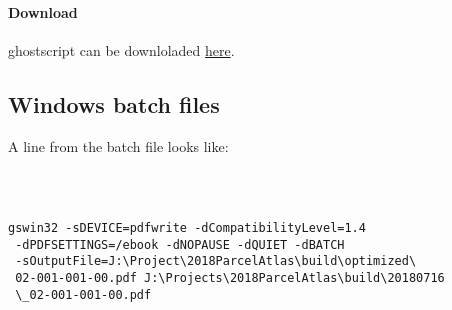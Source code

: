 \documentclass[class=article , crop=false, titlepage, twoside, multi={itemize, figure, verbatim}, float=false]{standalone}
\begin{document}
\paragraph{Download}
ghostscript can be downloladed \href{https://www.ghostscript.com/download/gsdnld.html}{here}.


\subsection{Windows batch files}
A line from the batch file looks like:\\
\begin{verbatim}



gswin32 -sDEVICE=pdfwrite -dCompatibilityLevel=1.4
 -dPDFSETTINGS=/ebook -dNOPAUSE -dQUIET -dBATCH 
 -sOutputFile=J:\Project\2018ParcelAtlas\build\optimized\
 02-001-001-00.pdf J:\Projects\2018ParcelAtlas\build\20180716
 \_02-001-001-00.pdf

\end{verbatim}
\end{document}
